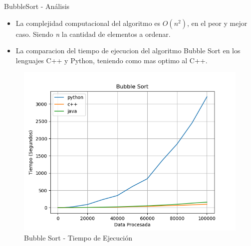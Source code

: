 \documentclass[11pt]{beamer}
\begin{document}
		\begin{frame}{BubbleSort - Análisis}
            \begin{itemize}
                \item La complejidad computacional del algoritmo es $O(n^{2})$, en el peor y mejor caso. Siendo \textit{n} la cantidad de elementos a ordenar.
                \item La comparacion del tiempo de ejecucion del algoritmo Bubble Sort en los lenguajes C++ y Python, teniendo como mas optimo al C++.
            \end{itemize}
            \begin{figure}[H]
				\centering
				\includegraphics[scale=0.40]{img/bubble_sort_grafica.png}
				\caption{Bubble Sort - Tiempo de Ejecución}
				\label{fig:bubble_sort_grafica}
			\end{figure}
		\end{frame}
		
\end{document}
